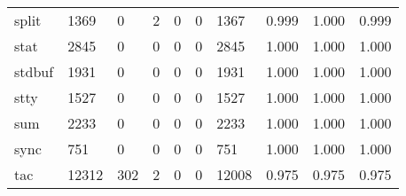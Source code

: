 \begin{longtable}{lp{1.3cm}p{1.3cm}p{1.3cm}p{1.3cm}p{1.3cm}p{1.3cm}p{1.3cm}p{1.3cm}p{1.3cm}}
split     &                   1369 &                                  0 &                                 2 &                                0 &                                 0 &                            1367 &                                0.999 &                                  1.000 &                                0.999 \\
stat      &                   2845 &                                  0 &                                 0 &                                0 &                                 0 &                            2845 &                                1.000 &                                  1.000 &                                1.000 \\
stdbuf    &                   1931 &                                  0 &                                 0 &                                0 &                                 0 &                            1931 &                                1.000 &                                  1.000 &                                1.000 \\
stty      &                   1527 &                                  0 &                                 0 &                                0 &                                 0 &                            1527 &                                1.000 &                                  1.000 &                                1.000 \\
sum       &                   2233 &                                  0 &                                 0 &                                0 &                                 0 &                            2233 &                                1.000 &                                  1.000 &                                1.000 \\
sync      &                    751 &                                  0 &                                 0 &                                0 &                                 0 &                             751 &                                1.000 &                                  1.000 &                                1.000 \\
tac       &                  12312 &                                302 &                                 2 &                                0 &                                 0 &                           12008 &                                0.975 &                                  0.975 &                                0.975 \\

\end{longtable}
